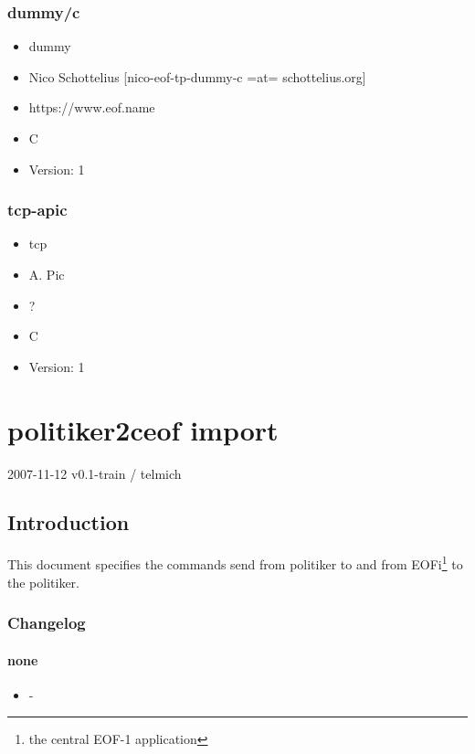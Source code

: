 \documentclass[12pt,a4paper]{book}
\begin{document}
\subsection{dummy/c}
\begin{itemize}
\item dummy
\item Nico Schottelius [nico-eof-tp-dummy-c =at= schottelius.org]
\item https://www.eof.name
\item C
\item Version: 1
\end{itemize}
\subsection{tcp-apic}
\begin{itemize}
\item tcp
\item A. Pic
\item ?
\item C
\item Version: 1
\end{itemize}

\chapter{politiker2ceof import}

2007-11-12 v0.1-train / telmich

\section{Introduction}
This document specifies the commands send from politiker to and from
EOFi\footnote{the central EOF-1 application} to the politiker.

\subsection{Changelog}
\subsubsection{none}
\begin{itemize}
\item -
\end{itemize}
\end{document}
